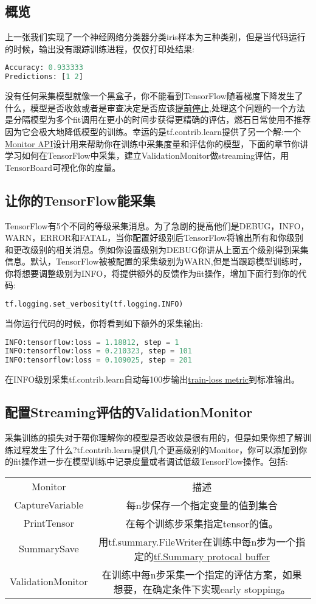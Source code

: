 \subsection{概览}
上一张我们实现了一个神经网络分类器分类iris样本为三种类别，但是当代码运行的时候，输出没有跟踪训练进程，仅仅打印处结果:
\begin{lstlisting}[language=Python]
Accuracy: 0.933333
Predictions: [1 2]
\end{lstlisting}
没有任何采集模型就像一个黑盒子，你不能看到TensorFlow随着梯度下降发生了什么，模型是否收敛或者是审查决定是否应该\href{https://en.wikipedia.org/wiki/Early_stopping}{提前停止},处理这个问题的一个方法是分隔模型为多个fit调用在更小的时间步获得更精确的评估，燃石日常使用不推荐因为它会极大地降低模型的训练。幸运的是tf.contrib.learn提供了另一个解:一个\href{https://www.tensorflow.org/api_docs/python/tf/contrib/learn/monitors}{Monitor API}设计用来帮助你在训练中采集度量和评估你的模型，下面的章节你讲学习如何在TensorFlow中采集，建立ValidationMonitor做streaming评估，用TensorBoard可视化你的度量。
\subsection{让你的TensorFlow能采集}
TensorFlow有5个不同的等级采集消息。为了急剧的提高他们是DEBUG，INFO，WARN，ERROR和FATAL，当你配置好级别后TensorFlow将输出所有和你级别和更改级别的相关消息。例如你设置级别为DEBUG你讲从上面五个级别得到采集信息。默认，TensorFlow被被配置的采集级别为WARN,但是当跟踪模型训练时，你将想要调整级别为INFO，将提供额外的反馈作为fit操作，增加下面行到你的代码:
\begin{lstlisting}[language=Python]
tf.logging.set_verbosity(tf.logging.INFO)
\end{lstlisting}
当你运行代码的时候，你将看到如下额外的采集输出:
\begin{lstlisting}[language=Python]
INFO:tensorflow:loss = 1.18812, step = 1
INFO:tensorflow:loss = 0.210323, step = 101
INFO:tensorflow:loss = 0.109025, step = 201
\end{lstlisting}
在INFO级别采集tf.contrib.learn自动每100步输出\href{}{train-loss metric}到标准输出。
\subsection{配置Streaming评估的ValidationMonitor}
采集训练的损失对于帮你理解你的模型是否收敛是很有用的，但是如果你想了解训练过程发生了什么?tf.contrib.learn提供几个更高级别的Monitor，你可以添加到你的fit操作进一步在模型训练中记录度量或者调试低级TensorFlow操作。包括:
\begin{tabular}{|c|c|}
Monitor&描述\\
CaptureVariable&每n步保存一个指定变量的值到集合\\
PrintTensor&在每个训练步采集指定tensor的值。\\
SummarySave&用tf.summary.FileWriter在训练中每n步为一个指定的\href{https://www.tensorflow.org/api_docs/python/tf/Summary}{tf.Summary protocal buffer}\\
ValidationMonitor&在训练中每n步采集一个指定的评估方案，如果想要，在确定条件下实现early stopping。\\
\end{tabular}
